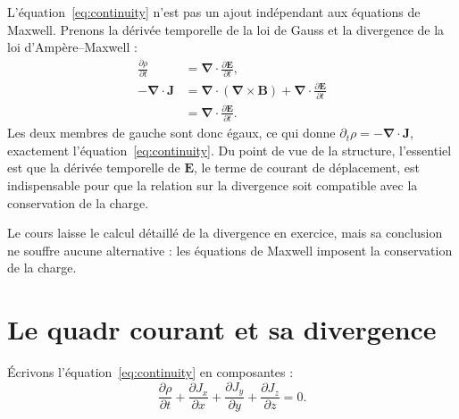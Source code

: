 L’équation~\eqref{eq:continuity} n’est pas un ajout indépendant aux équations de Maxwell. Prenons la dérivée temporelle de la loi de Gauss et la divergence de la loi d’Ampère--Maxwell :
\begin{align}
\frac{\partial\rho}{\partial t}
&=
\boldsymbol\nabla\cdot
\frac{\partial\mathbf E}{\partial t},
\\
-\boldsymbol\nabla\cdot\mathbf J
&=
\boldsymbol\nabla\cdot
(\boldsymbol\nabla\times\mathbf B)
+
\boldsymbol\nabla\cdot
\frac{\partial\mathbf E}{\partial t}
\\
&=
\boldsymbol\nabla\cdot
\frac{\partial\mathbf E}{\partial t}.
\end{align}
Les deux membres de gauche sont donc égaux, ce qui donne
\(\partial_t\rho=-\boldsymbol\nabla\cdot\mathbf J\), exactement l’équation~\eqref{eq:continuity}. Du point de vue de la structure, l’essentiel est que la dérivée temporelle de \(\mathbf E\), le terme de courant de déplacement, est indispensable pour que la relation sur la divergence soit compatible avec la conservation de la charge.

\begin{classroomqa}
\end{classroomqa}

Le cours laisse le calcul détaillé de la divergence en exercice, mais sa conclusion ne souffre aucune alternative : les équations de Maxwell imposent la conservation de la charge.

\section{Le quadr courant et sa divergence}

Écrivons l’équation~\eqref{eq:continuity} en composantes :
\begin{equation}
\frac{\partial\rho}{\partial t}
+
\frac{\partial J_x}{\partial x}
+
\frac{\partial J_y}{\partial y}
+
\frac{\partial J_z}{\partial z}
=0.
\label{eq:continuity-components}
\end{equation}

